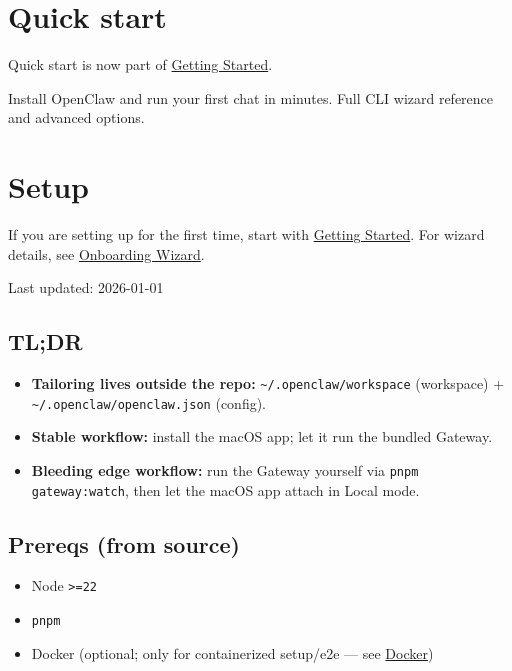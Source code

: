 \section{Quick start}


Quick start is now part of \href{/start/getting-started}{Getting Started}.

Install OpenClaw and run your first chat in minutes.
Full CLI wizard reference and advanced options.


\clearpage

\section{Setup}


If you are setting up for the first time, start with \href{/start/getting-started}{Getting Started}.
For wizard details, see \href{/start/wizard}{Onboarding Wizard}.

Last updated: 2026-01-01

\subsection{TL;DR}


\begin{itemize}
  \item \textbf{Tailoring lives outside the repo:} \texttt{\textasciitilde{}/.openclaw/workspace} (workspace) + \texttt{\textasciitilde{}/.openclaw/openclaw.json} (config).
  \item \textbf{Stable workflow:} install the macOS app; let it run the bundled Gateway.
  \item \textbf{Bleeding edge workflow:} run the Gateway yourself via \texttt{pnpm gateway:watch}, then let the macOS app attach in Local mode.
\end{itemize}


\subsection{Prereqs (from source)}


\begin{itemize}
  \item Node \texttt{>=22}
  \item \texttt{pnpm}
  \item Docker (optional; only for containerized setup/e2e — see \href{/install/docker}{Docker})
\end{itemize}


